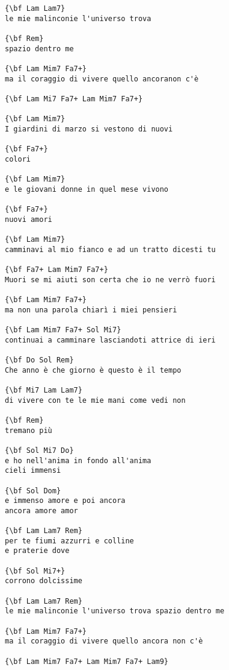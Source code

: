 \documentclass[a4paper]{article}
\begin{document}
\begin{multicols}{2}
\begin{Verbatim}[commandchars=\\\{\}]
{\bf Lam Lam7}
le mie malinconie l'universo trova

{\bf Rem}
spazio dentro me

{\bf Lam Mim7 Fa7+}
ma il coraggio di vivere quello ancoranon c'è

{\bf Lam Mi7 Fa7+ Lam Mim7 Fa7+}

{\bf Lam Mim7}
I giardini di marzo si vestono di nuovi

{\bf Fa7+}
colori

{\bf Lam Mim7}
e le giovani donne in quel mese vivono

{\bf Fa7+}
nuovi amori

{\bf Lam Mim7}
camminavi al mio fianco e ad un tratto dicesti tu

{\bf Fa7+ Lam Mim7 Fa7+}
Muori se mi aiuti son certa che io ne verrò fuori

{\bf Lam Mim7 Fa7+}
ma non una parola chiarì i miei pensieri

{\bf Lam Mim7 Fa7+ Sol Mi7}
continuai a camminare lasciandoti attrice di ieri

{\bf Do Sol Rem}
Che anno è che giorno è questo è il tempo

{\bf Mi7 Lam Lam7}
di vivere con te le mie mani come vedi non

{\bf Rem}
tremano più

{\bf Sol Mi7 Do}
e ho nell'anima in fondo all'anima
cieli immensi

{\bf Sol Dom}
e immenso amore e poi ancora
ancora amore amor

{\bf Lam Lam7 Rem}
per te fiumi azzurri e colline
e praterie dove

{\bf Sol Mi7+}
corrono dolcissime

{\bf Lam Lam7 Rem}
le mie malinconie l'universo trova spazio dentro me

{\bf Lam Mim7 Fa7+}
ma il coraggio di vivere quello ancora non c'è

{\bf Lam Mim7 Fa7+ Lam Mim7 Fa7+ Lam9}
\end{Verbatim}
\end{multicols}
\newpage
\end{document}
